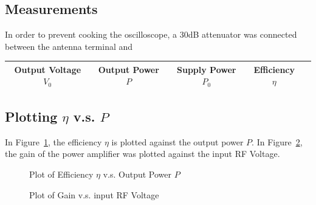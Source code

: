 \subsection{Measurements}
In order to prevent cooking the oscilloscope, a 30dB attenuator was connected
between the antenna terminal and

\begin{tabular}{|c|c|c|c|c|}
  \hline
  Output Voltage $V_0$ & Output Power $P$  & Supply Power $P_0$  & Efficiency
  $\eta$\\
  \hline

\end{tabular}

\subsection{Plotting $\eta$ v.s. $P$}

In Figure~\ref{fig:efficiencyvpower}, the efficiency $\eta$ is plotted against the
output power $P$. In Figure~\ref{fig:gainvRFvolt}, the gain of the power
amplifier was plotted against the input RF Voltage.

\begin{figure}[h!]
  \centering
    \label{fig:efficiencyvpower}
    \caption{Plot of Efficiency $\eta$ v.s. Output Power $P$}
\end{figure}

\begin{figure}[h!]
  \centering
    \label{fig:gainvRFvolt}
    \caption{Plot of Gain v.s. input RF Voltage}
\end{figure}
